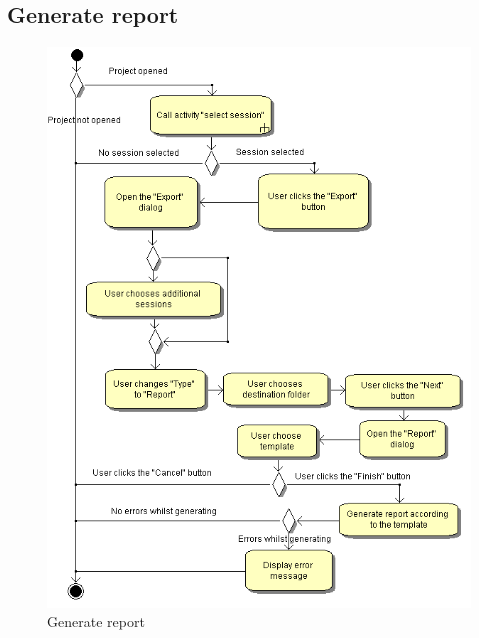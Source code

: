 \subsection{Generate report}
\begin{figure}[htb]
 \centering
 \includegraphics[height=0.7\textheight]{images/Activities/generate_report.png}
 \caption{Generate report}
 \label{ac_fg:report}
\end{figure}

\clearpage
